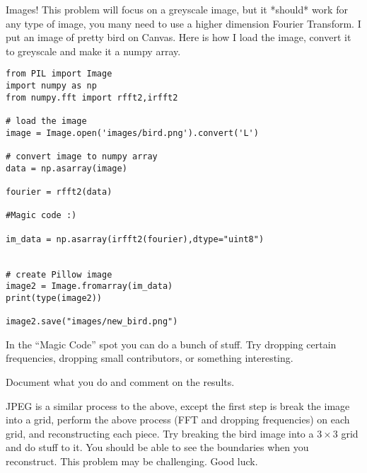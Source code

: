 \documentclass[11pt,letterpaper]{article}
\begin{document}
\begin{problem}
 Images! This problem will focus on a greyscale image, but it *should* work for any type of image,
you many need to use a higher dimension Fourier Transform. I put an image of pretty bird on Canvas.
Here is how I load the image, convert it to greyscale and make it a numpy array.
\begin{verbatim}
from PIL import Image
import numpy as np
from numpy.fft import rfft2,irfft2

# load the image
image = Image.open('images/bird.png').convert('L')

# convert image to numpy array
data = np.asarray(image)

fourier = rfft2(data)

#Magic code :)

im_data = np.asarray(irfft2(fourier),dtype="uint8")


# create Pillow image
image2 = Image.fromarray(im_data)
print(type(image2))

image2.save("images/new_bird.png")
\end{verbatim}

In the ``Magic Code'' spot you can do a bunch of stuff. Try dropping certain frequencies, dropping
small contributors, or something interesting. 

Document what you do and comment on the results. 

\end{problem}

\begin{problem}
 JPEG is a similar process to the above, except the first step is break the image into a grid, 
perform the above process (FFT and dropping frequencies) on each grid, and reconstructing each
piece. Try breaking the bird image into a $3\times 3$ grid and do stuff to it. You should be 
able to see the boundaries when you reconstruct. This problem may be challenging. Good luck.
\end{problem}
\end{document}
